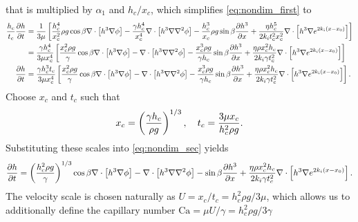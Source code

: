 that is multiplied by $\alpha_1$ and $h_c / x_c$, which simplifies \cref{eq:nondim_first} to 
\begin{align}
    \nonumber \frac{h_c}{t_c} \frac{\partial h}{\partial t} &= \frac{1}{3\mu} \left[ 
        \frac{h_c^4}{x_c^2} \rho g \cos \beta \nabla \cdot \left[ h^3\nabla\phi \right] - 
        \frac{\gamma h_c^4}{x_c^4} \nabla \cdot \left[ h^3 \nabla \nabla^2 \phi \right] - 
        \frac{h_c^3}{x_c} \rho g \sin\beta \frac{\partial h^3}{\partial x} + 
        \frac{\eta h_c^5}{2k_i t_c^2 x_c^2} \nabla \cdot \left[ h^3 \nabla e^{2k_i \left( x-x_0 \right)} \right]
     \right]\\ 
    \nonumber &= \frac{\gamma h_c^4}{3\mu x_c^4} \left[ 
        \frac{x_c^2 \rho g}{\gamma} \cos \beta \nabla \cdot \left[ h^3\nabla\phi \right] - 
        \nabla \cdot \left[ h^3 \nabla \nabla^2 \phi \right] - 
        \frac{x_c^3 \rho g}{\gamma h_c} \sin\beta \frac{\partial h^3}{\partial x} + 
        \frac{\eta \rho x_c^2 h_c}{2k_i \gamma t_c^2} \nabla \cdot \left[ h^3 \nabla e^{2k_i \left( x-x_0 \right)} \right]
     \right]\\
    \frac{\partial h}{\partial t} &= \frac{\gamma h_c^3 t_c}{3\mu x_c^4} \left[ 
        \frac{x_c^2 \rho g}{\gamma} \cos \beta \nabla \cdot \left[ h^3\nabla\phi \right] - 
        \nabla \cdot \left[ h^3 \nabla \nabla^2 \phi \right] - 
        \frac{x_c^3 \rho g}{\gamma h_c} \sin\beta \frac{\partial h^3}{\partial x} + 
        \frac{\eta \rho x_c^2 h_c}{2k_i \gamma t_c^2} \nabla \cdot \left[ h^3 \nabla e^{2k_i \left( x-x_0 \right)} \right]
     \right].
    \label{eq:nondim_sec}
\end{align}
Choose $x_c$ and $t_c$ such that 
\begin{align}
    x_c = \left( \frac{\gamma h_c}{\rho g} \right)^{1/3}, \quad t_c = \frac{3\mu x_c}{h_c^2 \rho g}.
    \label{eq:x_and_t_scales}
\end{align}
Substituting these scales into \cref{eq:nondim_sec} yields
\begin{align}
    \frac{\partial h}{\partial t} = \left( \frac{h_c^2 \rho g}{\gamma} \right)^{1/3} \cos\beta \nabla \cdot \left[  h^3 \nabla \phi  \right] - 
    \nabla \cdot \left[ h^3 \nabla\nabla^2\phi  \right] - 
    \sin\beta \frac{\partial h^3}{\partial x} + 
    \frac{\eta \rho x_c^2 h_c}{2k_i \gamma t_c^2} \nabla \cdot \left[ h^3 \nabla e^{2k_i \left( x-x_0 \right)} \right].
    \label{eq:nondim_third}
\end{align}  
The velocity scale is chosen naturally as $U = x_c/t_c = h_c^2\rho g/3\mu$,
which allows us to additionally define the capillary number $\mathrm{Ca} = \mu U / \gamma = h_c^2\rho g/3\gamma$
